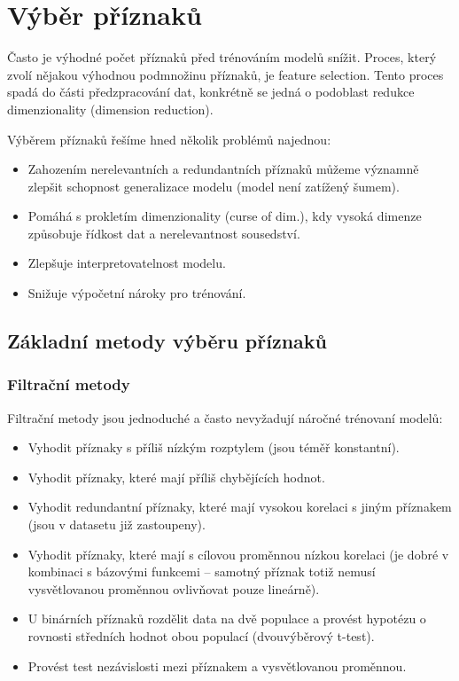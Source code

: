 \section{Výběr příznaků}

Často je výhodné počet příznaků před trénováním modelů snížit. Proces, který zvolí nějakou výhodnou podmnožinu příznaků, je feature selection. Tento proces spadá do části předzpracování dat, konkrétně se jedná o podoblast redukce dimenzionality (dimension reduction).

Výběrem příznaků řešíme hned několik problémů najednou:
\begin{itemize}
    \item Zahozením nerelevantních a redundantních příznaků můžeme významně zlepšit schopnost generalizace modelu (model není zatížený šumem).
    \item Pomáhá s prokletím dimenzionality (curse of dim.), kdy vysoká dimenze způsobuje řídkost dat a nerelevantnost sousedství.
    \item Zlepšuje interpretovatelnost modelu.
    \item Snižuje výpočetní nároky pro trénování.
\end{itemize}

\subsection{Základní metody výběru příznaků}

\subsubsection{Filtrační metody}

Filtrační metody jsou jednoduché a často nevyžadují náročné trénovaní modelů:
\begin{itemize}

    \item Vyhodit příznaky s příliš nízkým rozptylem (jsou téměř konstantní).

    \item Vyhodit příznaky, které mají příliš chybějících hodnot.

    \item Vyhodit redundantní příznaky, které mají vysokou korelaci s jiným příznakem (jsou v datasetu již zastoupeny).

    \item Vyhodit příznaky, které mají s cílovou proměnnou nízkou korelaci (je dobré v kombinaci s bázovými funkcemi -- samotný příznak totiž nemusí vysvětlovanou proměnnou ovlivňovat pouze lineárně).

    \item U binárních příznaků rozdělit data na dvě populace a provést hypotézu o rovnosti středních hodnot obou populací (dvouvýběrový t-test).

    \item Provést test nezávislosti mezi příznakem a vysvětlovanou proměnnou.

\end{itemize}

